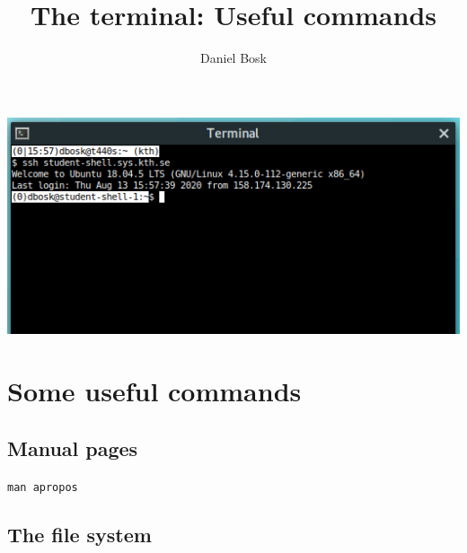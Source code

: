 \title{%
  The terminal: Useful commands
}
\author{Daniel Bosk}


\mode*


\begin{frame}
  \includegraphics[width=\columnwidth]{../../ssh/terminal.png}
\end{frame}


\section{Some useful commands}

\subsection{Manual pages}

\begin{frame}[fragile]
  \begin{center}
    \LARGE
    \lstinline[basicstyle=\LARGE]{man apropos}
  \end{center}
\end{frame}

\subsection{The file system}

